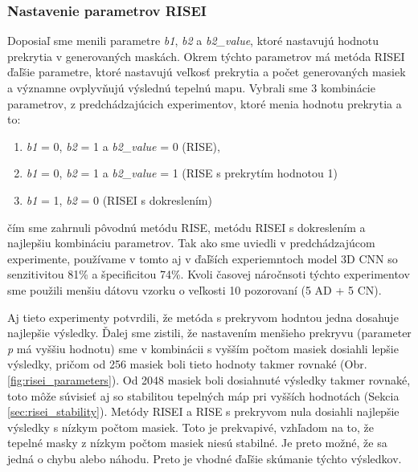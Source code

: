 \subsubsection{Nastavenie parametrov RISEI \label{sec:risei_parameters_experiment}}

Doposiaľ sme menili parametre \textit{b1}, \textit{b2} a \textit{b2\_value}, ktoré nastavujú hodnotu prekrytia v generovaných maskách. Okrem týchto parametrov má metóda RISEI ďaľšie parametre, ktoré nastavujú veľkosť prekrytia a počet generovaných masiek a významne ovplyvňujú výslednú tepelnú mapu. Vybrali sme 3 kombinácie parametrov, z predchádzajúcich experimentov, ktoré menia hodnotu prekrytia a to:

\begin{enumerate}[label=\Alph*]
    \item \textit{b1} = 0, \textit{b2} = 1 a \textit{b2\_value} = 0 (RISE),
    \item \textit{b1} = 0, \textit{b2} = 1 a \textit{b2\_value} = 1 (RISE s prekrytím hodnotou 1)
    \item \textit{b1} = 1, \textit{b2} = 0 (RISEI s dokreslením)
\end{enumerate}

čím sme zahrnuli pôvodnú metódu RISE, metódu RISEI s dokreslením a najlepšiu kombináciu parametrov. Tak ako sme uviedli v predchádzajúcom experimente, používame v tomto aj v ďaľších experiemntoch model 3D CNN so senzitivitou 81\% a špecificitou 74\%. Kvoli časovej náročnsoti týchto experimentov sme použili menšiu dátovu vzorku o veľkosti 10 pozorovaní (5 AD + 5 CN).

Aj tieto experimenty potvrdili, že metóda s prekryvom hodntou jedna dosahuje najlepšie výsledky. Ďalej sme zistili, že nastavením menšieho prekryvu (parameter \textit{p} má vyššiu hodnotu) sme v kombinácii s vyšším počtom masiek dosiahli lepšie výsledky, pričom od 256 masiek boli tieto hodnoty takmer rovnaké (Obr. \ref{fig:risei_parameters}). Od 2048 masiek boli dosiahnuté výsledky takmer rovnaké, toto môže súvisieť aj so stabilitou tepelných máp pri vyšších hodnotách (Sekcia \ref{sec:risei_stability}). Metódy RISEI a RISE s prekryvom nula dosiahli najlepšie výsledky s nízkym počtom masiek. Toto je prekvapivé, vzhľadom na to, že tepelné masky z nízkym počtom masiek niesú stabilné. Je preto možné, že sa jedná o chybu alebo náhodu. Preto je vhodné ďaľšie skúmanie týchto výsledkov.

